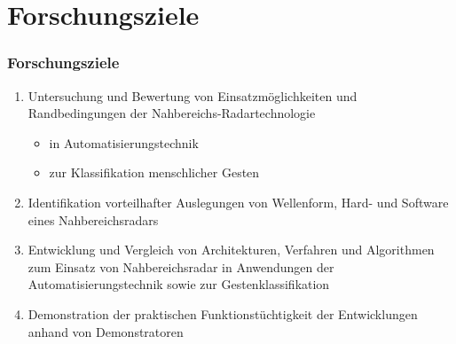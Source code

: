 \documentclass[16pt]{beamer}
\let\svpar\par
\let\svitemize\itemize
\let\svenditemize\enditemize
\let\svitem\item
\def\newpar{\def\par{\svpar\vfill}}
\def\newitem{\def\item{\vfill\svitem}}
\let\svcenter\center
\let\svendcenter\endcenter
\let\svcolumn\column
\let\svendcolumn\endcolumn
\newlength\columnskip
\def\newcolumn{%
	\renewenvironment{column}[2]%
	{\svcolumn{##1}\setlength{\parskip}{\columnskip}##2}%
	{\svendcolumn\vspace{\columnskip}}}
\newcommand\stretchy{\only<1>{%
		\newpar\def\item{\svitem\newitem}%
		\renewenvironment{itemize}{\svitemize}{\svenditemize\newpar\par}%
		\renewenvironment{center}{\svcenter\newpar}{\svendcenter\newpar}%
		\newcolumn
	}}
\begin{document}
\section{Forschungsziele}
\begin{frame}
\frametitle{Forschungsziele}
\stretchy
\begin{enumerate}
	\item Untersuchung und Bewertung von Einsatzmöglichkeiten und Randbedingungen der Nahbereichs-Radartechnologie 
		\begin{itemize}
			\item in Automatisierungstechnik 
			\item zur Klassifikation menschlicher Gesten
		\end{itemize} 
	\item Identifikation vorteilhafter Auslegungen von Wellenform, Hard- und Software eines Nahbereichsradars
	\item Entwicklung und Vergleich von Architekturen, Verfahren und Algorithmen zum Einsatz von Nahbereichsradar in Anwendungen der Automatisierungstechnik sowie zur Gestenklassifikation 
	\item Demonstration der praktischen Funktionstüchtigkeit der Entwicklungen anhand von Demonstratoren
\end{enumerate}
\end{frame}


\end{document}
